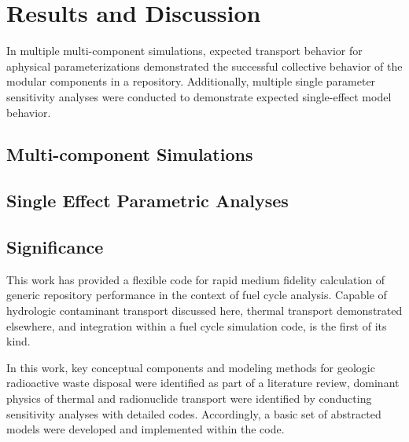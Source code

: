 \section{Results and Discussion}

In multiple multi-component simulations, expected transport behavior for aphysical
parameterizations demonstrated the successful collective behavior of the modular
components in a \Cyder repository.  Additionally, multiple single parameter
sensitivity analyses were conducted to demonstrate expected single-effect model
behavior.

\subsection{Multi-component Simulations}




\subsection{Single Effect Parametric Analyses}


\FloatBarrier
\subsection{Significance}

This work has provided a flexible code for rapid medium fidelity calculation
of generic repository performance in the context of fuel cycle analysis.
Capable of hydrologic contaminant transport discussed here, thermal transport
demonstrated elsewhere, and integration within a fuel cycle simulation code,
\Cyder is the first of its kind.

In this work, key conceptual components and modeling methods for geologic
radioactive waste disposal were identified as part of a literature review,
dominant physics of thermal and radionuclide transport were identified by
conducting sensitivity analyses with detailed codes. Accordingly, a basic set
of abstracted models were developed and implemented within the \Cyder code.

